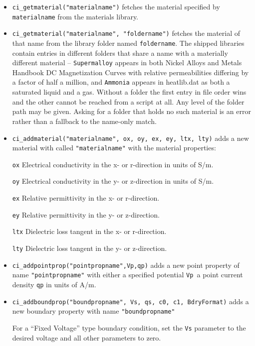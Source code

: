 \begin{itemize}
\item \texttt{ci\_getmaterial("materialname")} fetches the material specified by \texttt{materialname}
from the materials library.

\item \texttt{ci\_getmaterial("materialname", "foldername")} fetches the
material of that name from the library folder named \texttt{foldername}.
The shipped libraries contain entries in different folders that share a
name with a materially different material -- \texttt{Supermalloy} appears
in both Nickel Alloys and Metals Handbook DC Magnetization Curves with
relative permeabilities differing by a factor of half a million, and
\texttt{Ammonia} appears in heatlib.dat as both a saturated liquid and a
gas. Without a folder the first entry in file order wins and the other
cannot be reached from a script at all. Any level of the folder path may
be given. Asking for a folder that holds no such material is an error
rather than a fallback to the name-only match.

\item \texttt{ci\_addmaterial("materialname", ox, oy, ex, ey, ltx, lty)} adds a new material with
called \texttt{"materialname"} with the material properties:

\texttt{ox} Electrical conductivity in the x- or r-direction in units of S/m.

\texttt{oy} Electrical conductivity in the y- or z-direction in units of S/m.

\texttt{ex} Relative permittivity in the x- or r-direction.

\texttt{ey} Relative permittivity in the y- or z-direction.

\texttt{ltx} Dielectric loss tangent in the x- or r-direction.

\texttt{lty} Dielectric loss tangent in the y- or z-direction.

\item \texttt{ci\_addpointprop("pointpropname",Vp,qp)} adds a new point property of
name \texttt{"pointpropname"} with either a specified potential
\texttt{Vp }a point current density \texttt{qp} in units of A/m.

\item \texttt{ci\_addboundprop("boundpropname", Vs, qs, c0, c1, BdryFormat)} adds a
new boundary property with name \texttt{"boundpropname"}

For a ``Fixed Voltage'' type boundary condition, set the
\texttt{Vs} parameter to the desired voltage and all other
parameters to zero.


\end{itemize}

